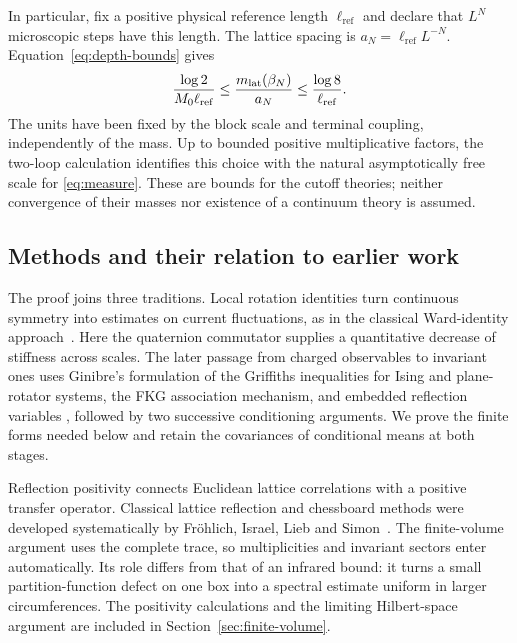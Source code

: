 In particular, fix a positive physical reference length
$\ell_{\mathrm{ref}}$ and declare that $L^N$ microscopic steps have
this length. The lattice spacing is $a_N=\ell_{\mathrm{ref}}L^{-N}$.
Equation~\eqref{eq:depth-bounds} gives
\begin{equation}
\label{eq:physical-main}
 \frac{\log2}{M_0\ell_{\mathrm{ref}}}
 \le \frac{m_{\mathrm{lat}}(\beta_N)}{a_N}
 \le \frac{\log8}{\ell_{\mathrm{ref}}}.
\end{equation}
The units have been fixed by the block scale and terminal coupling,
independently of the mass. Up to bounded positive multiplicative
factors, the two-loop calculation identifies this choice with the
natural asymptotically free scale for
\eqref{eq:measure}. These are bounds for the cutoff theories; neither
convergence of their masses nor existence of a continuum theory is
assumed.

\subsection{Methods and their relation to earlier work}

The proof joins three traditions. Local rotation identities turn
continuous symmetry into estimates on current fluctuations, as in the
classical Ward-identity approach~\cite{Mermin1967,DriesslerLandauPerez,AizenmanSimonWard}.
Here the quaternion commutator supplies a quantitative decrease of
stiffness across scales. The later passage from charged observables to
invariant ones uses Ginibre's formulation of the Griffiths inequalities
for Ising and plane-rotator systems, the FKG association mechanism, and
embedded reflection variables
\cite{Ginibre1970,FortuinKasteleynGinibre1971,Wolff1989}, followed by two
successive conditioning arguments. We prove the finite forms needed
below and retain the covariances of conditional means at both stages.

Reflection positivity connects Euclidean lattice correlations with a
positive transfer operator. Classical lattice reflection and chessboard
methods were developed systematically by Fr\"ohlich, Israel, Lieb and
Simon~\cite{FILS78,FILS80}. The finite-volume argument uses the complete
trace, so multiplicities and invariant sectors enter automatically.
Its role differs from that of an infrared bound: it turns a small
partition-function defect on one box into a spectral estimate uniform
in larger circumferences. The positivity calculations and the limiting
Hilbert-space argument are included in Section~\ref{sec:finite-volume}.

